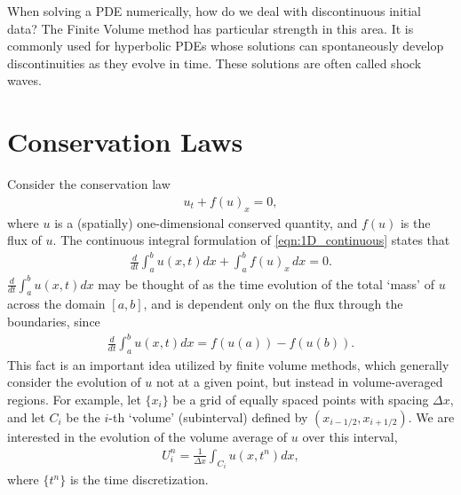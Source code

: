 \label{lab:finitevolume}

When solving a PDE numerically, how do we deal with discontinuous initial data?
The Finite Volume method has particular strength in this area.
It is commonly used for hyperbolic PDEs whose solutions can spontaneously develop discontinuities as they evolve in time.
These solutions are often called shock waves.

\section*{Conservation Laws}
Consider the conservation law
\begin{align}
\label{eqn:1D_continuous}
u_t + f(u)_x = 0,
\end{align}
where $u$ is a (spatially) one-dimensional conserved quantity, and $f(u)$ is the flux of $u$.
The continuous integral formulation of  \eqref{eqn:1D_continuous} states that
\begin{align*}
	\frac{d}{dt}\int_a^b u(x,t) dx + \int_a^b f(u)_x \,dx = 0.
\end{align*}
$\frac{d}{dt}\int_a^b u(x,t) dx$ may be thought of as the time evolution of the total `mass' of $u$ across the domain $[a,b]$, and is dependent only on the flux through the boundaries, since
\begin{align*}
\frac{d}{dt}\int_a^b u(x,t) dx = f(u(a))-f(u(b)).
\end{align*}
This fact is an important idea utilized by finite volume methods, which generally consider the evolution of $u$ not at a given point, but instead in volume-averaged regions.
For example, let $\{x_i\}$ be a grid of equally spaced points with spacing $\Delta x$, and let $C_i$ be the $i$-th `volume' (subinterval) defined by $(x_{i-1/2},x_{i+1/2})$.
We are interested in the evolution of the volume average of $u$ over this interval,
\begin{align*}
U_i^n  = \frac{1}{\Delta x}\int_{C_i} u(x,t^n)dx,
\end{align*}
where $\{t^n\}$ is the time discretization.

